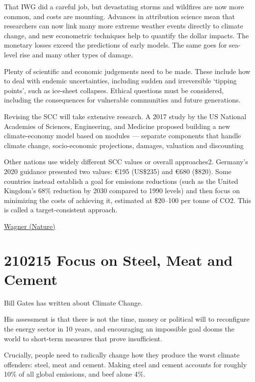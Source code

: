 \documentclass[
]{book}
\begin{document}
That IWG did a careful job, but devastating storms and wildfires are now more common, and costs are mounting. Advances in attribution science mean that researchers can now link many more extreme weather events directly to climate change, and new econometric techniques help to quantify the dollar impacts. The monetary losses exceed the predictions of early models. The same goes for sea-level rise and many other types of damage.

Plenty of scientific and economic judgements need to be made. These include how to deal with endemic uncertainties, including sudden and irreversible `tipping points', such as ice-sheet collapses. Ethical questions must be considered, including the consequences for vulnerable communities and future generations.

Revising the SCC will take extensive research.
A 2017 study by the US National Academies of Sciences, Engineering, and Medicine
proposed building a new climate-economy model based on modules ---
separate components that handle
climate change, socio-economic projections, damages, valuation and discounting

Other nations use widely different SCC values or overall approaches2. Germany's 2020 guidance presented two values: €195 (US\$235) and €680 (\$820). Some countries instead establish a goal for emissions reductions (such as the United Kingdom's 68\% reduction by 2030 compared to 1990 levels) and then focus on minimizing the costs of achieving it, estimated at \$20--100 per tonne of CO2. This is called a target-consistent approach.

\href{https://www.nature.com/articles/d41586-021-00441-0}{Wagner (Nature)}

\hypertarget{focus-on-steel-meat-and-cement}{%
\section{210215 Focus on Steel, Meat and Cement}\label{focus-on-steel-meat-and-cement}}

Bill Gates has written about Climate Change.

His assessment is that there is not the time, money or political will to reconfigure the energy sector in 10 years, and encouraging an impossible goal dooms the world to short-term measures that prove insufficient.

Crucially, people need to radically change how they produce the worst climate offenders: steel, meat and cement. Making steel and cement accounts for roughly 10\% of all global emissions, and beef alone 4\%.
\end{document}
